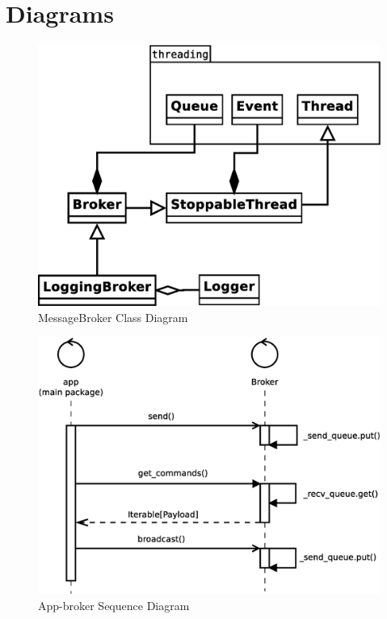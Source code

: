 \documentclass{article}
\begin{document}
\section{Diagrams}
\begin{figure}[H]
	\centering
	\includegraphics[width=\linewidth]{diagrams/BrokerDiagram.eps}
	\caption{MessageBroker Class Diagram}
\end{figure}

\begin{figure}[H]
	\centering
	\includegraphics[width=\linewidth]{diagrams/AppBrokerSequenceDiagram.eps}
	\caption{App-broker Sequence Diagram}
\end{figure}
\end{document}
